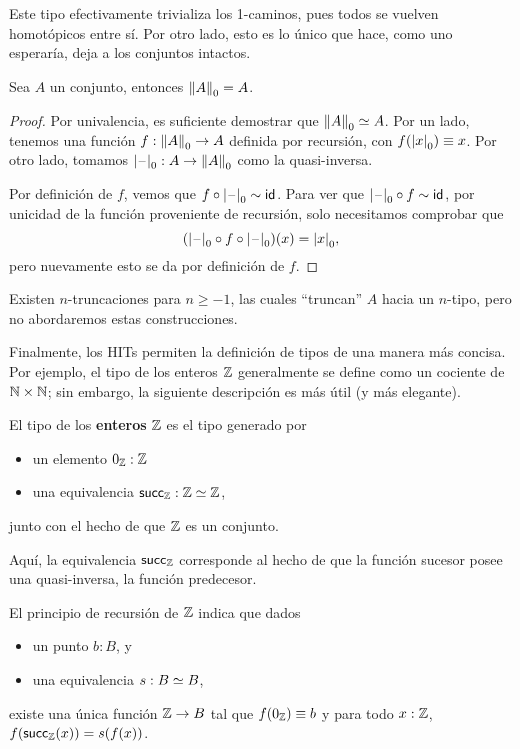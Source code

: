 \documentclass[../main.tex]{subfiles}
\begin{document}
Este tipo efectivamente trivializa los 1-caminos, pues todos se vuelven homot\'opicos entre s\'i. Por otro lado, esto es lo \'unico que hace, como uno esperar\'ia, deja a los conjuntos intactos.

\begin{proposition}\label{set-trunc-is-set}
  Sea $A$ un conjunto, entonces $\trunc0 A = A$.
\end{proposition}
\begin{proof}
  Por univalencia, es suficiente demostrar que $\eqv{\trunc0 A}{A}$.
  Por un lado, tenemos una funci\'on $f: \trunc0 A \to A$ definida por recursi\'on, con $f(\tproj0 x) \jdeq x$.
  Por otro lado, tomamos $\tprojf0: A \to \trunc0 A$ como la quasi-inversa.

  Por definici\'on de $f$, vemos que $f \circ \tprojf0 \htpy \idfunc$.
  Para ver que $\tprojf0 \circ f \htpy \idfunc$, por unicidad de la funci\'on proveniente de recursi\'on, solo necesitamos comprobar que
  \[ (\tprojf0 \circ f \circ \tprojf0)(x) = \tproj0 x, \]
  pero nuevamente esto se da por definici\'on de $f$.
\end{proof}

Existen $n$-truncaciones para $n \geq -1$, las cuales ``truncan'' $A$ hacia un $n$-tipo, pero no abordaremos estas construcciones.

Finalmente, los HITs permiten la definici\'on de tipos de una manera más concisa.
Por ejemplo, el tipo de los enteros $\Z$ generalmente se define como un cociente de $\N \times \N$; sin embargo, la siguiente descripción \cite{altenkirch_integers_2020} es m\'as \'util (y m\'as elegante).

\begin{definition}
  El tipo de los \textbf{enteros} $\Z$ es el tipo generado por
  \begin{itemize}
    \item un elemento $0_\Z : \Z$
    \item una equivalencia $\suc_\Z :\eqv{\Z}{\Z}$,
  \end{itemize}
  junto con el hecho de que $\Z$ es un conjunto.
\end{definition}

Aqu\'i, la equivalencia $\suc_\Z$ corresponde al hecho de que la funci\'on sucesor posee una quasi-inversa, la funci\'on predecesor.

El principio de recursi\'on de $\Z$ indica que dados
\begin{itemize}
  \item un punto $b : B$, y
  \item una equivalencia $s : \eqv{B}{B}$,
\end{itemize}
existe una \'unica funci\'on $\Z \to B$ tal que $f(0_\Z) \jdeq b$ y para todo $x:\Z$, $f(\suc_\Z(x))=s(f(x))$.
\end{document}

